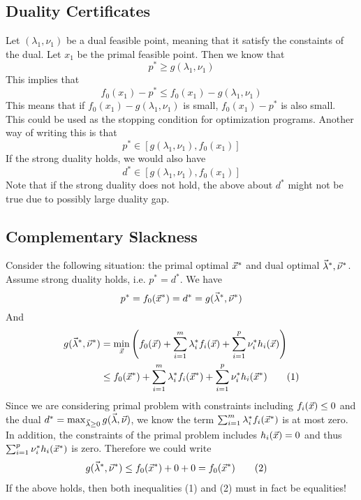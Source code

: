 
\subsection{Duality Certificates} %
\label{sub:duality_certificates}

\begin{definition}[certificate]
	Let $(\lambda_1, \nu_1)$ be a dual feasible point, meaning that it satisfy the constaints of the dual. Let $x_1$ be the primal feasible point. Then we know that
	\[
p^* \ge g(\lambda_1, \nu_1)
	\]
	This implies that
	\[
f_0(x_1)-p^* \le f_0(x_1)-g(\lambda_1, \nu_1)
	\]
	This means that if $f_0(x_1)-g(\lambda_1, \nu_1)$ is small, $f_0(x_1)-p^*$ is also small. This could be used as the stopping condition for optimization programs. Another way of writing this is that
	\[
p^* \in [g(\lambda_1, \nu_1), f_0(x_1)]
	\]
	If the strong duality holds, we would also have
	\[
d^* \in [g(\lambda_1, \nu_1), f_0(x_1)]
	\]
	Note that if the strong duality does not hold, the above about $d^*$ might not be true due to possibly large duality gap.
\end{definition}


\subsection{Complementary Slackness} %
\label{sub:complementary_slackness}

\begin{theorem}
	Consider the following situation: the primal optimal $\vec{x}^*$ and dual optimal $\vec{\lambda}^*, \vec{\nu}^*$. Assume strong duality holds, i.e. $p^*=d^*$. We have
	\[
p^* = f_0(\vec{x}^*) = d^* = g(\vec{\lambda}^*, \vec{\nu}^*)  
	\]
	And
	\begin{align*}
		g(\vec{\lambda}^*, \vec{\nu}^*) &= \min_{\vec{x}} \left(f_0(\vec{x})+\sum_{i=1}^m \lambda_i^*f_i(\vec{x})+\sum_{i=1}^p\nu_i^*h_i(\vec{x})\right)\\
		&\le f_0(\vec{x}^*) + \sum_{i=1}^m \lambda_i^*f_i(\vec{x}^*)+\sum_{i=1}^p\nu_i^*h_i(\vec{x}^*) \tag{1}
	\end{align*}
	Since we are considering primal problem with constraints including $f_i(\vec{x})\le 0$ and the dual $d^* = \max_{\vec{\lambda}\ge 0}g(\vec{\lambda},\vec{\nu})$, we know the term $\sum_{i=1}^m \lambda_i^*f_i(\vec{x}^*)$ is at most zero. In addition, the constraints of the primal problem includes $h_i(\vec{x})= 0$ and thus $\sum_{i=1}^p\nu_i^*h_i(\vec{x}^*)$ is zero. Therefore we could write
	\begin{align*}
		g(\vec{\lambda}^*, \vec{\nu}^*) &\le f_0(\vec{x}^*) +0 +0 = f_0(\vec{x}^*) \tag{2}
	\end{align*}
	If the above holds, then both inequalities (1) and (2) must in fact be equalities!
\end{theorem}

